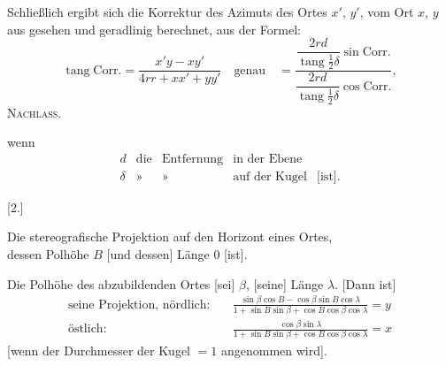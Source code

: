 Schließlich ergibt sich die Korrektur des Azimuts des Ortes $x'$, $y'$, vom Ort $x$, $y$ aus gesehen und geradlinig berechnet, aus der Formel:
\[
\operatorname{tang}\mathrm{Corr.}=\frac{x'y-xy'}{4rr+xx'+yy'}\quad\text{genau}\quad=\frac{\dfrac{2rd}{\operatorname{tang}\frac12\delta}\sin\mathrm{Corr.}}{\dfrac{2rd}{\operatorname{tang}\frac12\delta}\cos\mathrm{Corr.}},
\]
\clearpage
{}\hfill\textsc{Nachlass.}\hfill\mbox{}\par\medskip
wenn
\[
\begin{array}{rcccl}
d&\text{die}&\text{Entfernung}&\text{in der Ebene}&\\
\delta&\text{»}&\text{»}&\text{auf der Kugel}&\text{[ist].}
\end{array}
\]
\bigskip
\begin{center}
[2.]\par\medskip
Die stereografische Projektion auf den Horizont eines Ortes,\\dessen Polhöhe $B$ [und dessen] Länge $0$ [ist].
\end{center}
Die Polhöhe des abzubildenden Ortes [sei] $\beta$, [seine] Länge $\lambda$. [Dann ist]
\[
\begin{aligned}
\text{seine Projektion, nördlich:}\quad&\frac{\sin\beta\cos B-\cos\beta\sin B\cos\lambda}{1+\sin B\sin\beta+\cos B\cos\beta\cos\lambda}=y\\[6pt]
\text{östlich:}\quad&\frac{\cos\beta\sin\lambda}{1+\sin B\sin\beta+\cos B\cos\beta\cos\lambda}=x
\end{aligned}
\]
[wenn der Durchmesser der Kugel $=1$ angenommen wird].

